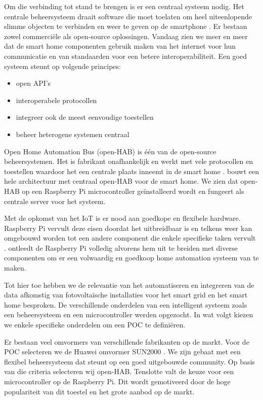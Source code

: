 \documentclass{hogent-article}
\begin{document}
    Om die verbinding tot stand te brengen is er een centraal systeem nodig. Het centrale beheersysteem draait software die moet toelaten om heel uiteenlopende slimme objecten te verbinden en weer te geven op de smartphone \autocite{Setz2021}. Er bestaan zowel commerciële als open-source oplossingen. Vandaag zien we meer en meer dat de smart home componenten gebruik maken van het internet voor hun communicatie en van standaarden voor een betere interoperabiliteit. Een goed systeem steunt op volgende principes: \begin{itemize}
        \item open API's
        \item interoperabele protocollen
        \item integreer ook de meest eenvoudige toestellen
        \item beheer heterogene systemen centraal
    \end{itemize}

    Open Home Automation Bus (open-HAB) is één van de open-source beheersystemen. Het is fabrikant onafhankelijk en werkt met vele protocollen en toestellen waardoor het een centrale plaats inneemt in de smart home \autocite{Domb2019}. \textcite{Sowah2020} bouwt een hele architectuur met centraal open-HAB voor de smart home. We zien dat open-HAB op een Raspberry Pi microcontroller geïnstalleerd wordt en fungeert als centrale server voor het systeem.
    
    Met de opkomst van het IoT is er nood aan goedkope en flexibele hardware. Raspberry Pi vervult deze eisen doordat het uitbreidbaar is en telkens weer kan omgebouwd worden tot een andere component die enkele specifieke taken vervult \autocite{Maksimovic2014}. \textcite{Jain2021} ontleedt de Raspberry Pi volledig alvorens hem uit te breiden met diverse componenten om er een volwaardig en goedkoop home automation systeem van te maken.
    
    Tot hier toe hebben we de relevantie van het automatiseren en integreren van de data afkomstig van fotovoltaïsche installaties voor het smart grid en het smart home besproken. De verschillende onderdelen van een intelligent systeem zoals een beheersysteem en een microcontroller werden opgezocht. In wat volgt kiezen we enkele specifieke onderdelen om een POC te definiëren.
    
    Er bestaan veel omvormers van verschillende fabrikanten op de markt. Voor de POC selecteren we de Huawei omvormer SUN2000 \autocite{SUN2000L2022}. We zijn gebaat met een flexibel beheersysteem dat steunt op een goed uitgebouwde community. Op basis van die criteria selecteren wij open-HAB. Tenslotte valt de keuze voor een microcontroller op de Raspberry Pi. Dit wordt gemotiveerd door de hoge populariteit van dit toestel en het grote aanbod op de markt.
    
\end{document}
